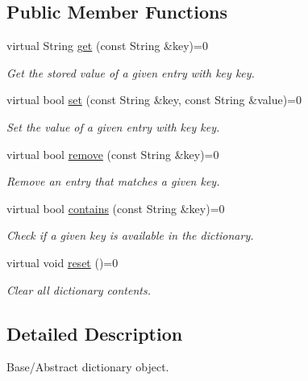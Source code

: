 \subsection*{Public Member Functions}
\begin{DoxyCompactItemize}
\item 
virtual String \mbox{\hyperlink{class_nv_mem_base_dict_a876f70d76462b15bfc23cab438077d17}{get}} (const String \&key)=0
\begin{DoxyCompactList}\small\item\em Get the stored value of a given entry with key {\ttfamily key}. \end{DoxyCompactList}\item 
virtual bool \mbox{\hyperlink{class_nv_mem_base_dict_aac0c8ea17230b315ff906bce84e94124}{set}} (const String \&key, const String \&value)=0
\begin{DoxyCompactList}\small\item\em Set the value of a given entry with key {\ttfamily key}. \end{DoxyCompactList}\item 
virtual bool \mbox{\hyperlink{class_nv_mem_base_dict_a11d82ceaa4bb8b003080a1640ba40446}{remove}} (const String \&key)=0
\begin{DoxyCompactList}\small\item\em Remove an entry that matches a given {\ttfamily key}. \end{DoxyCompactList}\item 
virtual bool \mbox{\hyperlink{class_nv_mem_base_dict_a755616173e4c94cf2a3cd227c38660d1}{contains}} (const String \&key)=0
\begin{DoxyCompactList}\small\item\em Check if a given {\ttfamily key} is available in the dictionary. \end{DoxyCompactList}\item 
virtual void \mbox{\hyperlink{class_nv_mem_base_dict_a1ae6a2c04b8adb81fc68e0abfd01c011}{reset}} ()=0
\begin{DoxyCompactList}\small\item\em Clear all dictionary contents. \end{DoxyCompactList}\end{DoxyCompactItemize}


\subsection{Detailed Description}
Base/\+Abstract dictionary object. 

